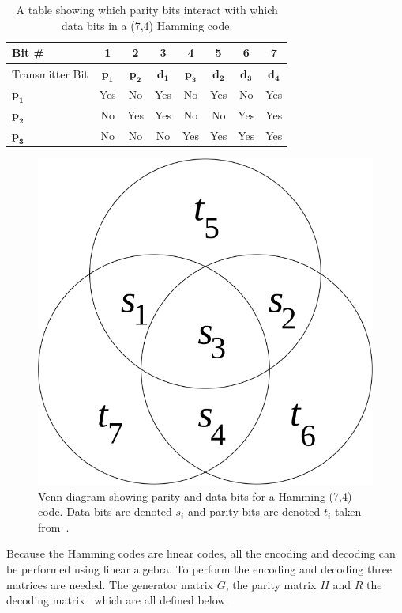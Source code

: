 \documentclass[12pt,onecolumn,letterpaper]{article}
\begin{document}
\begin{table}[H]
   \begin{center}
   \begin{tabular}{|l|c|c|c|c|c|c|c|}
   \hline
   Bit \# & 1 & 2 & 3 & 4 & 5 & 6 & 7 \\
   \hline\hline
   Transmitter Bit & $\mathbf{p_1}$ & $\mathbf{p_2}$ & $\mathbf{d_1}$ & $\mathbf{p_3}$ & $\mathbf{d_2}$ & $\mathbf{d_3}$ & $\mathbf{d_4}$ \\
   \hline
   $\mathbf{p_1}$ & \cellcolor{green}Yes & \cellcolor{red}No & \cellcolor{green}Yes & \cellcolor{red}No & \cellcolor{green}Yes & \cellcolor{red}No & \cellcolor{green}Yes \\
   $\mathbf{p_2}$ & \cellcolor{red}No & \cellcolor{green}Yes & \cellcolor{green}Yes & \cellcolor{red}No & \cellcolor{red}No & \cellcolor{green}Yes & \cellcolor{green}Yes \\
   $\mathbf{p_3}$ & \cellcolor{red}No & \cellcolor{red}No & \cellcolor{red}No & \cellcolor{green}Yes & \cellcolor{green}Yes & \cellcolor{green}Yes & \cellcolor{green}Yes \\
   \hline
   \end{tabular}
   \end{center}
   \caption{A table showing which parity bits interact with which data bits in a (7,4) Hamming code.}
   \label{tab:Hamming74Parity}
\end{table}
   

\begin{figure}
   \centering
   \includegraphics[width=0.2\linewidth]{figures/hamming_parity_venn_diagram.png}
   \caption{Venn diagram showing parity and data bits for a Hamming (7,4) code. Data bits are denoted $s_i$ and parity bits are denoted $t_i$ taken from~\cite{HammingMoonBook}.}
   \label{fig:HammingParityVennDiagram}
\end{figure}

Because the Hamming codes are linear codes, all the encoding and decoding can be performed using linear algebra. To perform the encoding and decoding three matrices are needed. The generator matrix $G$, the parity matrix $H$ and $R$ the decoding matrix~\cite{HammingMoonBook} which are all defined below.
\end{document}

